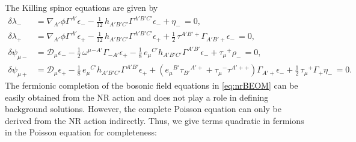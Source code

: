 \documentclass[a4paper,10pt,openany]{article}
\begin{document}
	The Killing spinor equations are given by \begin{subequations}\begin{align}
			\delta \lambda_{-}&=\nabla_{A'}\phi\Gamma^{A'}\epsilon_{-}-\frac{1}{12}\,h_{A'B'C'}\Gamma^{A'B'C'}\epsilon_{-}+\eta_-\,=0,\\
			\delta\lambda_{+}&=\nabla_{A'}\phi\Gamma^{A'}\epsilon_{+}-\frac{1}{12}\,h_{A'B'C'}\Gamma^{A'B'C'}\epsilon_{+}+\frac{1}{2}\,\tau^{A'B'+}\Gamma_{A'B'+}\epsilon_{-}\,=0,\\
			\delta \psi_{\mu -}&=\mathcal D_{\mu}\epsilon_{-}-\frac12\,\omega^{\mu}{}^{-A'}\Gamma_{-A'}\epsilon_+-\frac{1}{8}\,e_{\mu}{}^{C'}h_{A'B'C'}\Gamma^{A'B'}\epsilon_{-}+\tau_{\mu}{}^+ \rho_-\,=0,\\
			\delta \psi_{\mu +}&=\mathcal D_{\mu}\epsilon_{+}-\frac{1}{8}\,e_{\mu}{}^{C'}h_{A'B'C'}\Gamma^{A'B'}\epsilon_{+}+(e_{\mu}{}^{B'}\tau{}_{B'}{}^{A'+}+\tau_{\mu}{}^-\tau^{A'++})\Gamma_{A'+}\epsilon_{-}+\frac12\,\tau_{\mu}{}^+\Gamma_{+}\eta_-\,=0.
		\end{align}
	\end{subequations}
	The fermionic completion of the bosonic field equations in \eqref{eq:nrBEOM} can be easily obtained from the NR action and does not play a role in defining background solutions. However, the complete Poisson equation can only be derived from the NR action indirectly. Thus, we give terms quadratic in fermions in the Poisson equation for completeness:
\end{document}
